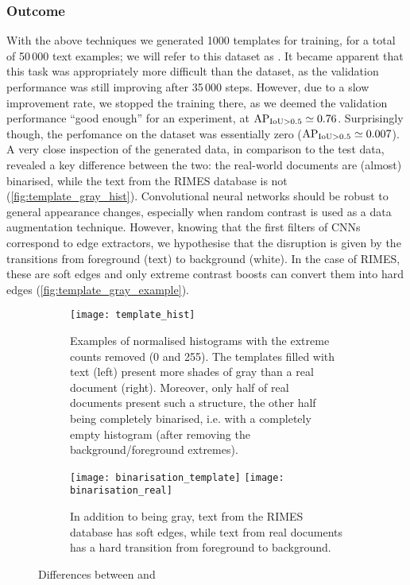 
		\subsubsection*{Outcome}
			With the above techniques we generated 1000 templates for training, for a total of 50\,000 text examples; we will refer to this dataset as . It became apparent that this task was appropriately more difficult than the  dataset, as the validation performance was still improving after 35\,000 steps. However, due to a slow improvement rate, we stopped the training there, as we deemed the validation performance ``good enough'' for an experiment, at \(\operatorname{\operatorname{AP}_{\operatorname{IoU} > 0.5}} \simeq 0.76\). Surprisingly though, the perfomance on the  dataset was essentially zero (\(\operatorname{\operatorname{AP}_{\operatorname{IoU} > 0.5}} \simeq 0.007\)). A very close inspection of the generated data, in comparison to the test data, revealed a key difference between the two: the real-world documents are (almost) binarised, while the text from the RIMES database is not (\autoref{fig:template_gray_hist}). Convolutional neural networks should be robust to general appearance changes, especially when random contrast is used as a data augmentation technique. However, knowing that the first filters of CNNs correspond to edge extractors, we hypothesise that the disruption is given by the transitions from foreground (text) to background (white). In the case of RIMES, these are soft edges and only extreme contrast boosts can convert them into hard edges (\autoref{fig:template_gray_example}).

			\begin{figure}
				\begin{subfigure}{\linewidth}
					\texttt{[image: template\_hist]}
					\caption[Template histograms]{
						Examples of normalised histograms with the extreme counts removed (0 and 255). The templates filled with text (left) present more shades of gray than a real document (right).  Moreover, only half of real documents present such a structure, the other half being completely binarised, i.e. with a completely empty histogram (after removing the background/foreground extremes).
					}
					\label{fig:template_gray_hist}
				\end{subfigure}
				\begin{subfigure}{\linewidth}
					\texttt{[image: binarisation\_template]}
					\texttt{[image: binarisation\_real]}
					\caption{In addition to being gray, text from the RIMES database has soft edges, while text from real documents has a hard transition from foreground to background.}
					\label{fig:template_gray_example}
				\end{subfigure}
				\caption{Differences between  and }
				\label{fig:template_gray}
			\end{figure}

